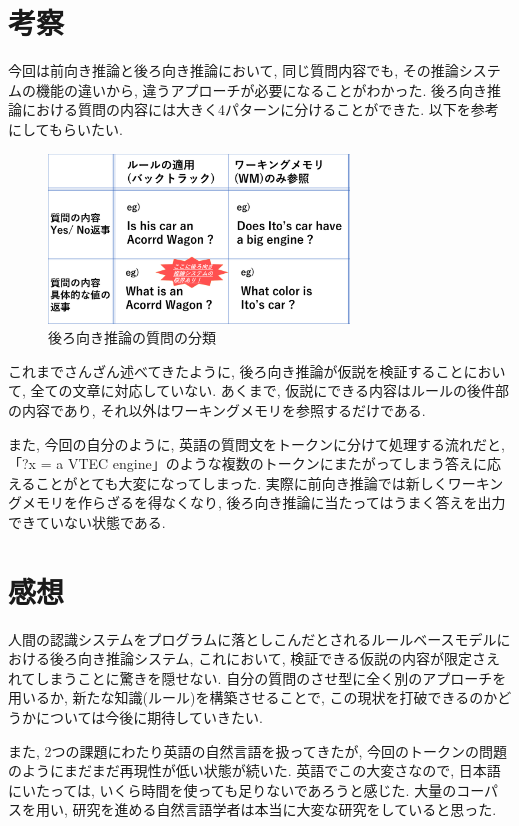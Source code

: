 \documentclass[uplatex,12pt]{jsarticle}
\begin{document}
\section{考察}
今回は前向き推論と後ろ向き推論において, 同じ質問内容でも, その推論システムの機能の違いから, 違うアプローチが必要になることがわかった. 後ろ向き推論における質問の内容には大きく4パターンに分けることができた. 以下を参考にしてもらいたい.

\begin{figure}[htbp]
 \begin{center}
  \includegraphics[width = 8cm, pagebox = cropbox, clip]{images/後ろ向き推論の質問の分類.pdf}
 \end{center}
 \caption[]{後ろ向き推論の質問の分類}\label{fig:fig1.1}
\end{figure}

これまでさんざん述べてきたように, 後ろ向き推論が仮説を検証することにおいて, 全ての文章に対応していない. あくまで, 仮説にできる内容はルールの後件部の内容であり, それ以外はワーキングメモリを参照するだけである.

また, 今回の自分のように, 英語の質問文をトークンに分けて処理する流れだと, 「?x = a VTEC engine」のような複数のトークンにまたがってしまう答えに応えることがとても大変になってしまった. 実際に前向き推論では新しくワーキングメモリを作らざるを得なくなり, 後ろ向き推論に当たってはうまく答えを出力できていない状態である.

\section{感想}
人間の認識システムをプログラムに落としこんだとされるルールベースモデルにおける後ろ向き推論システム, これにおいて, 検証できる仮説の内容が限定さえれてしまうことに驚きを隠せない. 自分の質問のさせ型に全く別のアプローチを用いるか, 新たな知識(ルール)を構築させることで, この現状を打破できるのかどうかについては今後に期待していきたい. 

また, 2つの課題にわたり英語の自然言語を扱ってきたが, 今回のトークンの問題のようにまだまだ再現性が低い状態が続いた. 英語でこの大変さなので, 日本語にいたっては, いくら時間を使っても足りないであろうと感じた. 大量のコーパスを用い, 研究を進める自然言語学者は本当に大変な研究をしていると思った.
\end{document}
